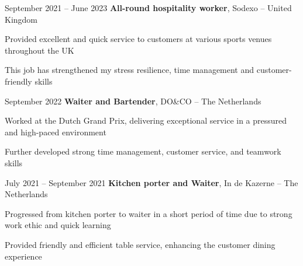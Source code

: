 	\vspace{0.2 cm}
	
	\begin{twocolentry}{
			September 2021 – June 2023
		}
		\textbf{All-round hospitality worker}, Sodexo -- United Kingdom
	\end{twocolentry}
	
	\vspace{0.10 cm}
	\begin{onecolentry}
		\begin{highlights}
			\item Provided excellent and quick service to customers at various sports venues throughout the UK
			\item This job has strengthened my stress resilience, time management and customer-friendly skills
		\end{highlights}
	\end{onecolentry}
	
	\vspace{0.2 cm}
	
		\begin{twocolentry}{
			September 2022
		}
		\textbf{Waiter and Bartender}, DO\&CO -- The Netherlands\end{twocolentry}
	
	\vspace{0.10 cm}
	\begin{onecolentry}
		\begin{highlights}
			\item Worked at the Dutch Grand Prix, delivering exceptional service in a pressured and high-paced environment
			\item Further developed strong time management, customer service, and teamwork skills
		\end{highlights}
	\end{onecolentry}
	
	\vspace{0.2 cm}
	
		\begin{twocolentry}{
			July 2021 – September 2021
		}
		\textbf{Kitchen porter and Waiter}, In de Kazerne -- The Netherlands\end{twocolentry}
	
	\vspace{0.10 cm}
	\begin{onecolentry}
		\begin{highlights}
			\item Progressed from kitchen porter to waiter in a short period of time due to strong work ethic and quick learning
			\item Provided friendly and efficient table service, enhancing the customer dining experience
		\end{highlights}
	\end{onecolentry}
	
